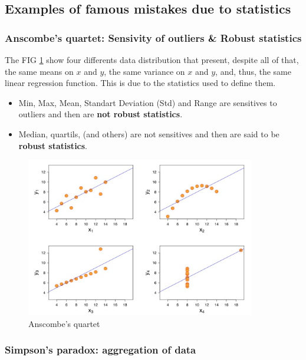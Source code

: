 \documentclass[a4paper,11pt,twoside]{article}
\begin{document}
\subsection{Examples of famous mistakes due to statistics}

\subsubsection{Anscombe's quartet: Sensivity of outliers \& Robust statistics}

The FIG \ref{pic:anscombe} show four differents data distribution that present, despite all of that, the same means on $x$ and $y$, the same variance on $x$ and $y$, and, thus, the same linear regression function. This is due to the statistics used to define them. 

\begin{itemize}
    \item Min, Max, Mean, Standart Deviation (Std) and Range are sensitives to outliers and then are \textbf{not robust statistics}.
    \item Median, quartils, (and others) are not sensitives and then are said to be \textbf{robust statistics}. 
\end{itemize}



\begin{figure}[h]%
 \centering
 \includegraphics[width=10cm]{./pic/anscombe}
 \caption{\label{pic:anscombe} Anscombe's quartet}
\end{figure}

\subsubsection{Simpson's paradox: aggregation of data}
\end{document}
